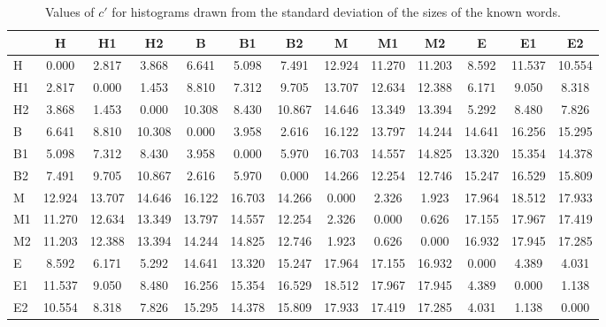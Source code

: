 \begin{table*}[h!]
\begin{center}
\begin{tabular}{| l | c | c | c | c | c | c | c | c | c | c | c | c |}\hline
 & H & H1 & H2 & B & B1 & B2 & M & M1 & M2 & E & E1 & E2 \\\hline
H & 0.000  & 2.817  & 3.868  & 6.641  & 5.098  & 7.491  & 12.924  & 11.270  & 11.203  & 8.592  & 11.537  & 10.554 \\\hline
H1 & 2.817  & 0.000  & 1.453  & 8.810  & 7.312  & 9.705  & 13.707  & 12.634  & 12.388  & 6.171  & 9.050  & 8.318 \\\hline
H2 & 3.868  & 1.453  & 0.000  & 10.308  & 8.430  & 10.867  & 14.646  & 13.349  & 13.394  & 5.292  & 8.480  & 7.826 \\\hline
B & 6.641  & 8.810  & 10.308  & 0.000  & 3.958  & 2.616  & 16.122  & 13.797  & 14.244  & 14.641  & 16.256  & 15.295 \\\hline
B1 & 5.098  & 7.312  & 8.430  & 3.958  & 0.000  & 5.970  & 16.703  & 14.557  & 14.825  & 13.320  & 15.354  & 14.378 \\\hline
B2 & 7.491  & 9.705  & 10.867  & 2.616  & 5.970  & 0.000  & 14.266  & 12.254  & 12.746  & 15.247  & 16.529  & 15.809 \\\hline
M & 12.924  & 13.707  & 14.646  & 16.122  & 16.703  & 14.266  & 0.000  & 2.326  & 1.923  & 17.964  & 18.512  & 17.933 \\\hline
M1 & 11.270  & 12.634  & 13.349  & 13.797  & 14.557  & 12.254  & 2.326  & 0.000  & 0.626  & 17.155  & 17.967  & 17.419 \\\hline
M2 & 11.203  & 12.388  & 13.394  & 14.244  & 14.825  & 12.746  & 1.923  & 0.626  & 0.000  & 16.932  & 17.945  & 17.285 \\\hline
E & 8.592  & 6.171  & 5.292  & 14.641  & 13.320  & 15.247  & 17.964  & 17.155  & 16.932  & 0.000  & 4.389  & 4.031 \\\hline
E1 & 11.537  & 9.050  & 8.480  & 16.256  & 15.354  & 16.529  & 18.512  & 17.967  & 17.945  & 4.389  & 0.000  & 1.138 \\\hline
E2 & 10.554  & 8.318  & 7.826  & 15.295  & 14.378  & 15.809  & 17.933  & 17.419  & 17.285  & 4.031  & 1.138  & 0.000 \\\hline
\end{tabular}
\caption{Values of $c'$ for histograms drawn from the standard deviation of the sizes of the known words.}
\end{center}
\end{table*}